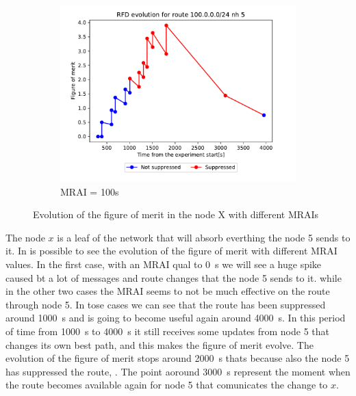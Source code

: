 \begin{figure}[h]
     \hfill
     \begin{subfigure}[b]{0.3\textwidth}
         \centering
         \includegraphics[width=\textwidth]{images/RFD/clique/FigureOfMerit/mrai21_RFD_x_rfd_R1.pdf}
         \caption{MRAI = 100s}
         \label{fig:clique_x_mrai100}
     \end{subfigure}
        \caption{Evolution of the figure of merit in the node X with different MRAIs}
        \label{fig:clique_nodex}
\end{figure}

The node $x$ is a leaf of the network that will absorb everthing the node \num{5}
sends to it.
In  is possible to see the evolution of the figure of merit
with different \ac{MRAI} values.
In the first case, with an \ac{MRAI} qual to \SI{0}{\second} we will see a huge
spike caused bt a lot of messages and route changes that the node \num{5} sends
to it.
while in the other two cases  
the \ac{MRAI} seems to not be much effective on the route through node \num{5}.
In tose cases we can see that the route has been suppressed around \SI{1000}{\second}
and is going to become useful again around \SI{4000}{\second}.
In this period of time from \SI{1000}{\second} to \SI{4000}{\second} it still
receives some updates from node \num{5} that changes its own best path, and this
makes the figure of merit evolve.
The evolution of the figure of merit stops around \SI{2000}{\second} thats because
also the node \num{5} has suppressed the route, .
The point aoround \SI{3000}{\second} represent the moment when the route becomes
available again for node \num{5} that comunicates the change to $x$.

